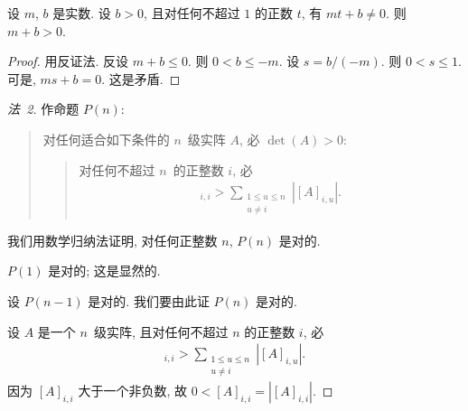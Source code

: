 \begin{theorem}
    设 \(m\), \(b\) 是实数.
    设 \(b > 0\), 且对任何不超过 \(1\) 的正数 \(t\),
    有 \(mt + b \neq 0\).
    则 \(m + b > 0\).
\end{theorem}

\begin{proof}
    用反证法.
    反设 \(m + b \leq 0\).
    则 \(0 < b \leq -m\).
    设 \(s = b/(-m)\).
    则 \(0 < s \leq 1\).
    可是, \(ms + b = 0\).
    这是矛盾.
\end{proof}

\begin{proof}[法~2]
    作命题 \(P(n)\):
    \begin{quotation}
        对任何适合如下条件的 \(n\)~级实阵 \(A\),
        必 \(\det {(A)} > 0\):
        \begin{quotation}
            对任何不超过 \(n\)~的正整数 \(i\),
            必
            \begin{align*}
                [A]_{i,i} >
                \sum_{\substack{1 \leq u \leq n \\
                    u \neq i}} {|[A]_{i,u}|}.
            \end{align*}
        \end{quotation}
    \end{quotation}
    我们用数学归纳法证明,
    对任何正整数 \(n\),
    \(P(n)\) 是对的.

    \(P(1)\) 是对的; 这是显然的.

    设 \(P(n-1)\) 是对的.
    我们要由此证 \(P(n)\) 是对的.

    设 \(A\) 是一个 \(n\)~级实阵,
    且对任何不超过 \(n\) 的正整数 \(i\), 必
    \begin{align*}
        [A]_{i,i} >
        \sum_{\substack{1 \leq u \leq n \\
            u \neq i}} {|[A]_{i,u}|}.
    \end{align*}
    因为 \([A]_{i,i}\) 大于一个非负数,
    故 \(0 < [A]_{i,i} = |[A]_{i,i}|\).


\end{proof}
